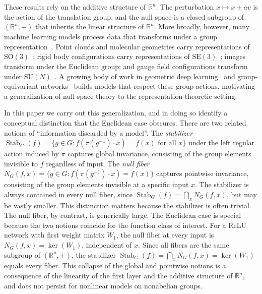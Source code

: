 \documentclass[11pt]{article}
\DeclareMathOperator{\kernel}{ker}
\DeclareMathOperator{\Stab}{Stab}
\newcommand{\RR}{\mathbb{R}}
\begin{document}
These results rely on the additive structure of $\RR^n$. The perturbation $x \mapsto x + av$ is the action of the translation group, and the null space is a closed subgroup of $(\RR^n, +)$ that inherits the linear structure of $\RR^n$. More broadly, however, many machine learning models process data that transforms under a group representation~\cite{hall2015lie,steinberg2012representation}. Point clouds and molecular geometries carry representations of $\mathrm{SO}(3)$~\cite{thomas2018tensor}; rigid body configurations carry representations of $\mathrm{SE}(3)$~\cite{fuchs2020se}; images transform under the Euclidean group; and gauge field configurations transform under $\mathrm{SU}(N)$~\cite{boyda2021sampling,kanwar2020equivariant}. A growing body of work in geometric deep learning~\cite{bronstein2021geometric,bronstein2017geometric} and group-equivariant networks~\cite{bradshaw2025learning,cohen2016group,gerken2023geometric,kondor2018generalization} builds models that respect these group actions, motivating a generalization of null space theory to the representation-theoretic setting.

In this paper we carry out this generalization, and in doing so identify a conceptual distinction that the Euclidean case obscures. There are two related notions of ``information discarded by a model''. The \emph{stabilizer} $\Stab_G(f) = \{g \in G : f(\pi(g^{-1}) \cdot x) = f(x) \text{ for all } x\}$ under the left regular action induced by $\pi$ captures global invariance, consisting of the group elements invisible to $f$ regardless of input. The \emph{null fiber} $N_G(f, x) = \{g \in G : f(\pi(g^{-1}) \cdot x) = f(x)\}$ captures pointwise invariance, consisting of the group elements invisible at a specific input $x$. The stabilizer is always contained in every null fiber, since $\Stab_G(f) = \bigcap_x N_G(f,x)$, but may be vastly smaller. This distinction matters because the stabilizer is often trivial. The null fiber, by contrast, is generically large. The Euclidean case is special because the two notions coincide for the function class of interest. For a ReLU network with first weight matrix $W_1$, the null fiber at every input is $N_G(f, x) = \kernel(W_1)$, independent of $x$. Since all fibers are the same subgroup of $(\RR^n, +)$, the stabilizer $\Stab_G(f) = \bigcap_x N_G(f, x) = \kernel(W_1)$ equals every fiber. This collapse of the global and pointwise notions is a consequence of the linearity of the first layer and the additive structure of $\RR^n$, and does not persist for nonlinear models on nonabelian groups.
\end{document}

